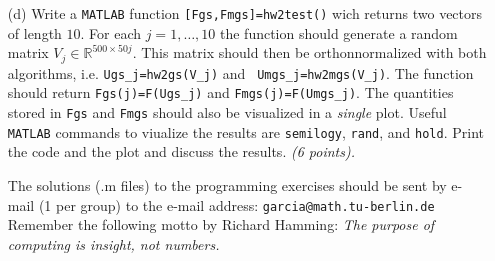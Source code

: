 \documentclass[10pt]{report}
\begin{document}
\begin{enumerate}
\begin{enumerate}
    \item[(d)]  Write a \verb+MATLAB+ function \verb+[Fgs,Fmgs]=hw2test()+ wich
    returns two vectors of length $10$. For each $j=1,\ldots,10$ the function
    should generate a random matrix $V_j\in\mathbb{R}^{500\times50j}$. This
    matrix should then be orthonnormalized with both algorithms, i.e.
    \verb+Ugs_j=hw2gs(V_j)+ and \verb+ Umgs_j=hw2mgs(V_j)+. The function should return
    \verb+Fgs(j)=F(Ugs_j)+ and \verb+Fmgs(j)=F(Umgs_j)+. The quantities stored in \verb+Fgs+
    and \verb+Fmgs+ should also be visualized in a \textit{single} plot. Useful \verb+MATLAB+ commands to viualize the results are \verb+semilogy+, \verb+rand+, and \verb+hold+. Print the code and the plot and discuss  the results. \textit{(6 points).}
\vspace{0.3em}

The solutions (.m files) to the programming exercises should be sent by e-mail (1 per group) to the e-mail address: \verb+garcia@math.tu-berlin.de+ \\


Remember the following motto by Richard Hamming: 
\textit{The purpose of computing is insight, not numbers.}
\end{enumerate}




\end{enumerate}
\end{document}
